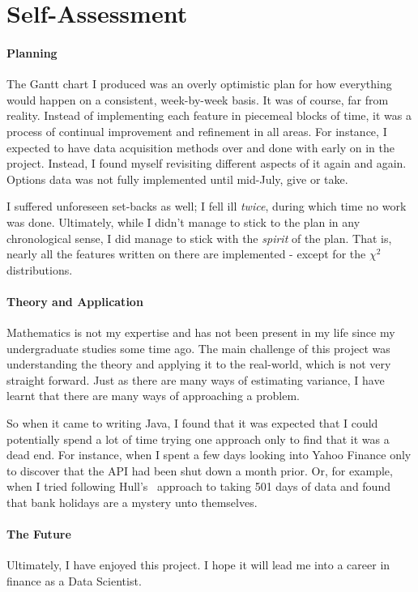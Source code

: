 \documentclass[../Dissertation.tex]{subfiles}
\begin{document}
\section{Self-Assessment}

\paragraph{Planning}

The Gantt chart I produced was an overly optimistic plan for how everything would happen on a consistent, week-by-week basis.
It was of course, far from reality.
Instead of implementing each feature in piecemeal blocks of time, it was a process of continual improvement and refinement in all areas.
For instance, I expected to have data acquisition methods over and done with early on in the project.
Instead, I found myself revisiting different aspects of it again and again.
Options data was not fully implemented until mid-July, give or take.

I suffered unforeseen set-backs as well; I fell ill \textit{twice}, during which time no work was done.
Ultimately, while I didn't manage to stick to the plan in any chronological sense, I did manage to stick with the \textit{spirit} of the plan.
That is, nearly all the features written on there are implemented - except for the $\chi^2$ distributions.
\paragraph{Theory and Application}
Mathematics is not my expertise and has not been present in my life since my undergraduate studies some time ago.
The main challenge of this project was understanding the theory and applying it to the real-world, which is not very straight forward.
Just as there are many ways of estimating variance, I have learnt that there are many ways of approaching a problem.

So when it came to writing Java, I found that it was expected that I could potentially spend a lot of time trying one approach only to find that it was a dead end.
For instance, when I spent a few days looking into Yahoo Finance only to discover that the API had been shut down a month prior.
Or, for example, when I tried following Hull's~\cite{Hull:2012} approach to taking 501 days of data and found that bank holidays are a mystery unto themselves.
\paragraph{The Future}
Ultimately, I have enjoyed this project.
I hope it will lead me into a career in finance as a Data Scientist.
\end{document}
